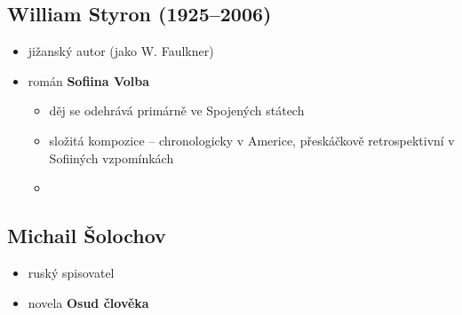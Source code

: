 \subsection{William Styron (1925--2006)}
\begin{itemize}
\item jižanský autor (jako W. Faulkner)
\item román \textbf{Sofiina Volba}
	\begin{itemize}
	\item děj se odehrává primárně ve Spojených státech
	\item složitá kompozice -- chronologicky v Americe, přeskáčkově retrospektivní v Sofiiných vzpomínkách
	\item 	
	\end{itemize}
\end{itemize}

\subsection{Michail Šolochov}
\begin{itemize}
\item ruský spisovatel
\item novela \textbf{Osud člověka}
\end{itemize}

